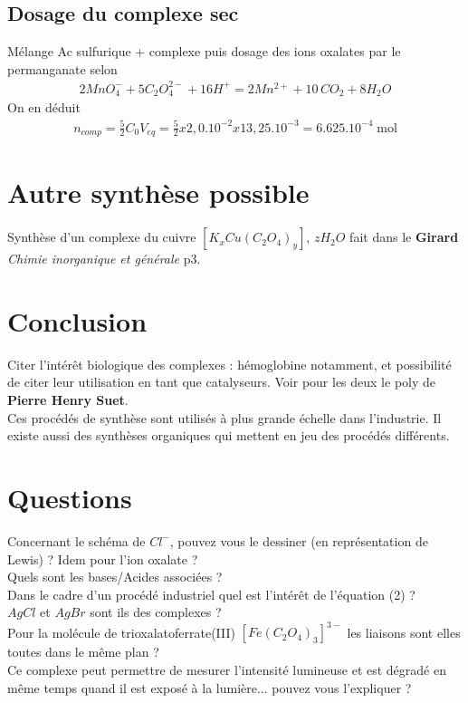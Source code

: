 \documentclass[12pt,prb,aps,epsf]{article}
\begin{document}
\subsection{Dosage du complexe sec}
Mélange Ac sulfurique + complexe puis dosage des ions oxalates par le permanganate selon
\begin{eqnarray}
2MnO_4^- + 5C_2O_4^{2-} + 16H^+ = 2Mn^{2+} + 10\,CO_2 + 8H_2O
\end{eqnarray}
On en déduit 
\begin{eqnarray}
n_{comp} = \frac{5}{2}C_0V_{eq} = \frac{5}{2} x 2,0.10^{-2} x 13,25.10^{-3} = 6.625.10^{-4}\;\mathrm{mol}
\end{eqnarray}

\section{Autre synthèse possible}
Synthèse d'un complexe du cuivre $[K_xCu(C_2O_4)_y],\,zH_2O$ fait dans le \textbf{Girard} \textit{Chimie inorganique et générale} p3.

\section{Conclusion}
Citer l'intérêt biologique des complexes : hémoglobine notamment, et possibilité de citer leur utilisation en tant que catalyseurs. Voir pour les deux le poly de \textbf{Pierre Henry Suet}.\\
Ces procédés de synthèse sont utilisés à plus grande échelle dans l'industrie. Il existe aussi des synthèses organiques qui mettent en jeu des procédés différents.

\section*{Questions}
Concernant le schéma de $Cl^-$, pouvez vous le dessiner (en représentation de Lewis) ? Idem pour l'ion oxalate ?\\
Quels sont les bases/Acides associées ?\\

Dans le cadre d'un procédé industriel quel est l'intérêt de l'équation (2) ?\\

$AgCl$ et $AgBr$ sont ils des complexes ?\\

Pour la molécule de trioxalatoferrate(III) $[Fe(C_2O_4)_3]^{3-}$ les liaisons sont elles toutes dans le même plan ?\\
Ce complexe peut permettre de mesurer l'intensité lumineuse et est dégradé en même temps quand il est exposé à la lumière... pouvez vous l'expliquer ?\\
\end{document}
